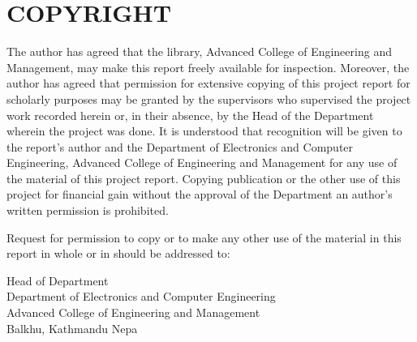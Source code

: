 \documentclass[main]{subfiles}
\begin{document}
\section*{\centering \Large{\textbf{COPYRIGHT}}}
The author has agreed that the library, Advanced College of Engineering and Management,
may make this report freely available for inspection. Moreover, the author has agreed that
permission for extensive copying of this project report for scholarly purposes may be granted
by the supervisors who supervised the project work recorded herein or, in their absence, by the
Head of the Department wherein the project was done. It is understood that recognition will
be given to the report’s author and the Department of Electronics and Computer Engineering,
Advanced College of Engineering and Management for any use of the material of this project
report. Copying publication or the other use of this project for financial gain without the
approval of the Department an author’s written permission is prohibited.\par

\noindent Request for permission to copy or to make any other use of the material in this report in
whole or in should be addressed to:

\vspace{1cm}
Head of Department\\
Department of Electronics and Computer Engineering\\
Advanced College of Engineering and Management\\
Balkhu, Kathmandu
Nepa
\end{document}
